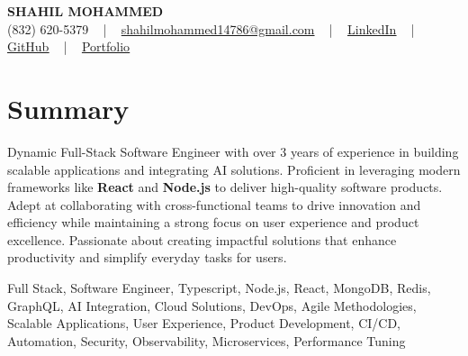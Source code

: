 \documentclass[letterpaper,10pt]{article}
\begin{document}
\begin{center}
    {\fontsize{14pt}{12pt}\selectfont \textbf{\MakeUppercase{Shahil Mohammed}}}\\ \vspace{2pt}
    \fontsize{10pt}{12pt}\selectfont (832) 620-5379 ~ | ~ \href{mailto:shahilmohammed14786@gmail.com}{shahilmohammed14786@gmail.com} ~ | ~  
    \href{https://www.linkedin.com/in/shahil-mohammed-9652931a1/}{\color{blue}\underline{LinkedIn}}  ~ | ~ 
    \href{https://github.com/freakbeast14}{\color{blue}\underline{GitHub}} ~ | ~ 
    \href{https://shahil-mohammed.netlify.app/}{\color{blue}\underline{Portfolio}}
    \vspace{-8pt}
\end{center}

\section{Summary}
\vspace{-2pt}\fontsize{8pt}{9pt}\selectfont
Dynamic Full-Stack Software Engineer with over 3 years of experience in building scalable applications and integrating AI solutions. Proficient in leveraging modern frameworks like \textbf{React} and \textbf{Node.js} to deliver high-quality software products. Adept at collaborating with cross-functional teams to drive innovation and efficiency while maintaining a strong focus on user experience and product excellence. Passionate about creating impactful solutions that enhance productivity and simplify everyday tasks for users.
 \vspace{-5pt}
 
{\fontsize{1pt}{1pt}\selectfont\color{white}
Full Stack, Software Engineer, Typescript, Node.js, React, MongoDB, Redis, GraphQL, AI Integration, Cloud Solutions, DevOps, Agile Methodologies, Scalable Applications, User Experience, Product Development, CI/CD, Automation, Security, Observability, Microservices, Performance Tuning
}
\vspace{-8pt}

\vspace{-2pt}
\end{document}
